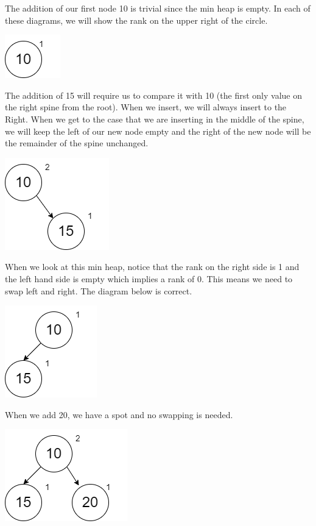 \documentclass[
]{book}
\begin{document}
The addition of our first node 10 is trivial since the min heap is empty. In each of these diagrams, we will show the rank on the upper right of the circle.

\includegraphics{images/heap1.drawio.png}

The addition of 15 will require us to compare it with 10 (the first only value on the right spine from the root). When we insert, we will always insert to the Right. When we get to the case that we are inserting in the middle of the spine, we will keep the left of our new node empty and the right of the new node will be the remainder of the spine unchanged.

\includegraphics{images/heap2.drawio.png}

When we look at this min heap, notice that the rank on the right side is 1 and the left hand side is empty which implies a rank of 0. This means we need to swap left and right. The diagram below is correct.

\includegraphics{images/heap3.drawio.png}

When we add 20, we have a spot and no swapping is needed.

\includegraphics{images/heap4.drawio.png}
\end{document}
